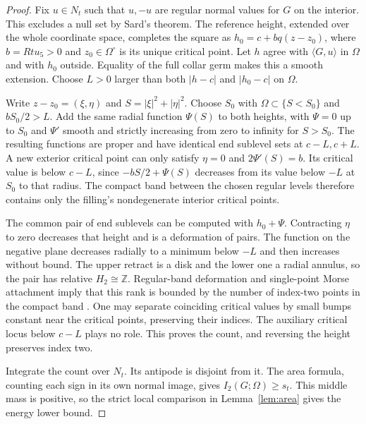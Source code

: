 \documentclass[11pt,letterpaper]{article}
\numberwithin{equation}{section}
\theoremstyle{definition}
\begin{document}
\begin{proof}
Fix \(u\in N_t\) such that \(u,-u\) are regular normal values
for \(G\) on the interior. This excludes a null set by Sard's theorem.
The reference height, extended over the whole coordinate space,
completes the square as \(h_0=c+bq(z-z_0)\), where
\(b=Rt u_5>0\) and \(z_0\in\Omega^\circ\) is its unique
critical point. Let \(h\) agree with \(\langle G,u\rangle\)
in \(\Omega\) and with \(h_0\) outside. Equality of the full
collar germ makes this a smooth extension. Choose \(L>0\)
larger than both \(|h-c|\) and \(|h_0-c|\) on \(\Omega\).

Write \(z-z_0=(\xi,\eta)\) and \(S=|\xi|^2+|\eta|^2\).
Choose \(S_0\) with \(\Omega\subset\{S<S_0\}\) and \(bS_0/2>L\).
Add the same radial function \(\Psi(S)\) to both heights,
with \(\Psi=0\) up to \(S_0\) and \(\Psi'\) smooth and strictly
increasing from zero to infinity for \(S>S_0\).
The resulting functions are proper and have identical end
sublevel sets at \(c-L,c+L\). A new exterior critical point can
only satisfy \(\eta=0\) and \(2\Psi'(S)=b\). Its critical
value is below \(c-L\), since \(-bS/2+\Psi(S)\) decreases
from its value below \(-L\) at \(S_0\) to that radius.
The compact band between the chosen regular levels therefore
contains only the filling's nondegenerate interior critical points.

The common pair of end sublevels can be computed with
\(h_0+\Psi\). Contracting \(\eta\) to zero decreases that
height and is a deformation of pairs. The function on the negative
plane decreases radially to a minimum below \(-L\) and
then increases without bound. The upper retract is a disk and
the lower one a radial annulus, so the pair has relative
\(H_2\cong\mathbb Z\). Regular-band deformation and single-point
Morse attachment imply that this rank is bounded by the number
of index-two points in the compact band
\cite[Theorems 3.1--3.2 and Remark~3.3]{Milnor1963MorseTheory}.
One may separate coinciding critical values by small bumps
constant near the critical points, preserving their indices.
The auxiliary critical locus below \(c-L\) plays no role.
This proves the count, and reversing the height preserves index two.

Integrate the count over \(N_t\). Its antipode is disjoint
from it. The area formula, counting each sign in its own
normal image, gives \(I_2(G;\Omega)\ge s_t\).
This middle mass is positive, so the strict local comparison
in Lemma~\ref{lem:area} gives the energy lower bound.
\end{proof}
\end{document}
